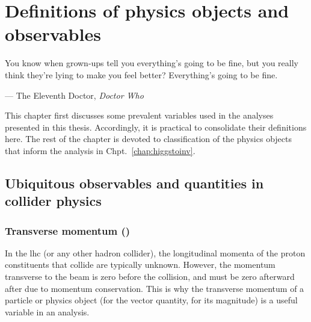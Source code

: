 \chapter{Definitions of physics objects and observables}
\label{chap:objects}


\epigraph{You know when grown-ups tell you everything’s going to be fine, but you really think they’re lying to make you feel better? Everything’s going to be fine.}{--- The Eleventh Doctor, \emph{Doctor Who}}

This chapter first discusses some prevalent variables used in the analyses presented in this thesis. Accordingly, it is practical to consolidate their definitions here. The rest of the chapter is devoted to classification of the physics objects that inform the analysis in Chpt.~\ref{chap:higgstoinv}.




\section{Ubiquitous observables and quantities in collider physics}
\label{sec:objects_important_observables}




\subsection{Transverse momentum (\texorpdfstring{\ptvec}{pt})}
\label{subsec:objects_pt}

In the \acrshort{lhc} (or any other hadron collider), the longitudinal momenta of the proton constituents that collide are typically unknown. However, the momentum transverse to the beam is zero before the collision, and must be zero afterward after due to momentum conservation. This is why the transverse momentum of a particle or physics object (\ptvec for the vector quantity, \pt for its magnitude) is a useful variable in an analysis.




\subsection{\texorpdfstring{\HT}{HT}}
\label{subsec:objects_ht}

